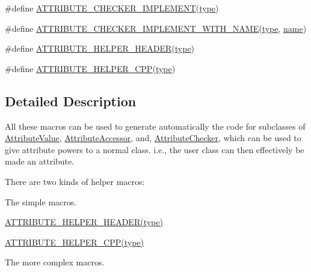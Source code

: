 \begin{DoxyCompactItemize}
\item 
\#define \hyperlink{group__attributehelper_ga87c7604a9f872336f7d46b4a3666862d}{A\+T\+T\+R\+I\+B\+U\+T\+E\+\_\+\+C\+H\+E\+C\+K\+E\+R\+\_\+\+I\+M\+P\+L\+E\+M\+E\+NT}(\hyperlink{visualizer-ideas_8txt_add98db9e15e2a58cf2b57623e7aa893a}{type})
\item 
\#define \hyperlink{group__attributehelper_ga6dc3c2e10ed32b4d6987347567de3f21}{A\+T\+T\+R\+I\+B\+U\+T\+E\+\_\+\+C\+H\+E\+C\+K\+E\+R\+\_\+\+I\+M\+P\+L\+E\+M\+E\+N\+T\+\_\+\+W\+I\+T\+H\+\_\+\+N\+A\+ME}(\hyperlink{visualizer-ideas_8txt_add98db9e15e2a58cf2b57623e7aa893a}{type},  \hyperlink{generate__test__data__lte__spectrum__model_8m_ab74e6bf80237ddc4109968cedc58c151}{name})
\item 
\#define \hyperlink{group__attributehelper_ga55f148f11c61b206b4e846f8e9d14bca}{A\+T\+T\+R\+I\+B\+U\+T\+E\+\_\+\+H\+E\+L\+P\+E\+R\+\_\+\+H\+E\+A\+D\+ER}(\hyperlink{visualizer-ideas_8txt_add98db9e15e2a58cf2b57623e7aa893a}{type})
\item 
\#define \hyperlink{group__attributehelper_ga02f4f05f51c4aa6602f3146357219b9a}{A\+T\+T\+R\+I\+B\+U\+T\+E\+\_\+\+H\+E\+L\+P\+E\+R\+\_\+\+C\+PP}(\hyperlink{visualizer-ideas_8txt_add98db9e15e2a58cf2b57623e7aa893a}{type})
\end{DoxyCompactItemize}


\subsection{Detailed Description}
All these macros can be used to generate automatically the code for subclasses of \hyperlink{classns3_1_1AttributeValue}{Attribute\+Value}, \hyperlink{classns3_1_1AttributeAccessor}{Attribute\+Accessor}, and, \hyperlink{classns3_1_1AttributeChecker}{Attribute\+Checker}, which can be used to give attribute powers to a normal class. i.\+e., the user class can then effectively be made an attribute.

There are two kinds of helper macros\+:
\begin{DoxyEnumerate}
\item The simple macros.
\begin{DoxyItemize}
\item \hyperlink{group__attributehelper_ga55f148f11c61b206b4e846f8e9d14bca}{A\+T\+T\+R\+I\+B\+U\+T\+E\+\_\+\+H\+E\+L\+P\+E\+R\+\_\+\+H\+E\+A\+D\+E\+R(type)}
\item \hyperlink{group__attributehelper_ga02f4f05f51c4aa6602f3146357219b9a}{A\+T\+T\+R\+I\+B\+U\+T\+E\+\_\+\+H\+E\+L\+P\+E\+R\+\_\+\+C\+P\+P(type)}
\end{DoxyItemize}
\item The more complex macros.
\end{DoxyEnumerate}

